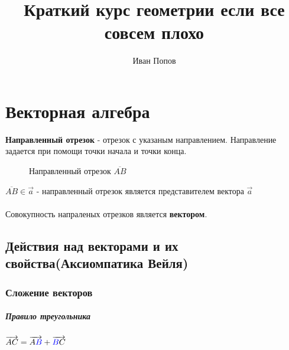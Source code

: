 \documentclass{book}
\title{Краткий курс геометрии если все совсем плохо}
\author{Иван Попов}
\begin{document}
\maketitle
\newpage
{}

\tableofcontents

\newpage

\chapter{Векторная алгебра}
\textbf{Направленный отрезок} - отрезок с указаным направлением. Направление задается при помощи точки начала и точки конца.\\
\begin{figure}[h!]
    \centering
\caption{Направленный отрезок $\overline{AB}$}
\end{figure}
$\overline{AB} \in \overrightarrow{a}$ - направленный отрезок является представителем вектора $\overrightarrow{a}$
\\
\\
Совокупность напраленых отрезков является \textbf{вектором}.
\section{Действия над векторами и их свойства(Аксиомпатика Вейля)}
\subsection{Сложение векторов}
\paragraph{Правило треугольника}
$\\\\\overrightarrow{AC}=\overrightarrow{A\textcolor{blue}B}+\overrightarrow{\textcolor{blue}{B}C}$
\begin{figure}[h!]
\end{figure}
\end{document}
